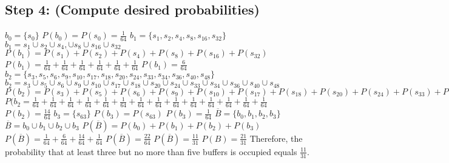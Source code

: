 \documentclass[a4paper,10pt]{article}
\begin{document}
\subsection{Step 4: (Compute desired probabilities)}
$ b_{0} = \{s_{0}\} $ \newline
$ P(b_{0}) = P(s_{0}) = \frac{1}{64} $ \newline
$ b_{1} = \{s_{1}, s_{2}, s_{4}, s_{8}, s_{16}, s_{32}\} $ \newline
$ b_{1} = s_{1} \cup s_{2} \cup s_{4}, \cup s_{8} \cup s_{16} \cup s_{32} $ \newline
$ P(b_{1}) = P(s_{1}) + P(s_{2}) + P(s_{4}) + P(s_{8}) + P(s_{16}) + P(s_{32}) $ \newline
$ P(b_{1}) = \frac{1}{64} + \frac{1}{64} + \frac{1}{64} + \frac{1}{64} + \frac{1}{64} + \frac{1}{64} $ \newline
$ P(b_{1}) = \frac{6}{64} $ \newline
$ b_{2} = \{s_{3}, s_{5}, s_{6}, s_{9}, s_{10}, s_{17}, s_{18}, s_{20}, s_{24}, s_{33}, s_{34}, s_{36}, s_{40}, 
s_{48}\} $ \newline
$ b_{2} = s_{3} \cup s_{5} \cup s_{6} \cup s_{9} \cup s_{10} \cup s_{17} \cup s_{18} \cup s_{20} \cup s_{24} \cup 
s_{33} \cup s_{34} \cup s_{36} \cup s_{40} \cup s_{48} $ \newline
$ P(b_{2}) = P(s_{3}) + P(s_{5}) + P(s_{6}) + P(s_{9}) + P(s_{10}) + P(s_{17}) + P(s_{18}) + P(s_{20}) + P(s_{24}) + 
P(s_{33}) + P(s_{34}) + P(s_{36}) + P(s_{40}) + P(s_{48}) $ \newline
$ P(b_{2} = \frac{1}{64} + \frac{1}{64} + \frac{1}{64} + \frac{1}{64} + \frac{1}{64} + \frac{1}{64} + \frac{1}{64} + 
\frac{1}{64} + \frac{1}{64} + \frac{1}{64} + \frac{1}{64} + \frac{1}{64} + \frac{1}{64} + \frac{1}{64} $ \newline
$ P(b_{2}) = \frac{14}{64} $ \newline
$ b_{3} = \{s_{63}\} $ \newline
$ P(b_{3}) = P(s_{63}) $ \newline
$ P(b_{3}) = \frac{1}{64} $ \newline
$ \overline{B} = \{b_{0}, b_{1}, b_{2}, b_{3}\} $ \newline
$ \overline{B} = b_{0} \cup b_{1} \cup b_{2} \cup b_{3} $ \newline
$ P(\overline{B}) = P(b_{0}) + P(b_{1}) + P(b_{2}) + P(b_{3}) $ \newline
$ P(\overline{B}) = \frac{1}{64} + \frac{6}{64} + \frac{14}{64} + \frac{1}{64} $ \newline
$ P(\overline{B}) = \frac{22}{64} $ \newline
$ P(\overline{B}) = \frac{11}{31} $ \newline
$ P(B) = \frac{21}{31} $ \newline 
Therefore, the probability that at least three but no more than five buffers is occupied equals $ \frac{11}{31} $.
\end{document}
